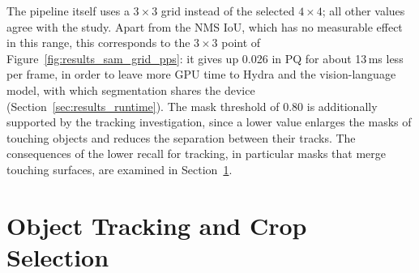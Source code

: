 {\small The pipeline itself uses a $3 \times 3$ grid instead of the selected $4 \times 4$; all other values agree with the study. Apart from the NMS IoU, which has no measurable effect in this range, this corresponds to the $3 \times 3$ point of Figure~\ref{fig:results_sam_grid_pps}: it gives up 0.026 in PQ for about 13\,ms less per frame, in order to leave more GPU time to Hydra and the vision-language model, with which segmentation shares the device (Section~\ref{sec:results_runtime}). The mask threshold of 0.80 is additionally supported by the tracking investigation, since a lower value enlarges the masks of touching objects and reduces the separation between their tracks. The consequences of the lower recall for tracking, in particular masks that merge touching surfaces, are examined in Section~\ref{sec:results_tracking}.\par}





























\trkCampaignTable

\trkRevisitTable

\section{Object Tracking and Crop Selection}
\label{sec:results_tracking}

